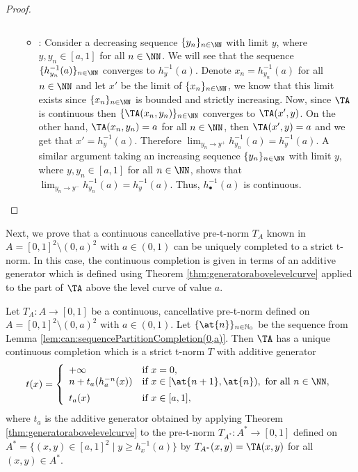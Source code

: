 \begin{proof}
\begin{enumerate}[label=(\roman*)]
\begin{itemize}
$$		$$
		\item \underline{}: Consider a decreasing sequence $\{y_n\}_{n \in \NN}$ with limit $y$, where $y,y_n \in [a,1]$ for all $n\in \NN$. We will see that the sequence $\{h_{y_n}^{-1}(a)\}_{n \in \NN}$ converges to $h_{y}^{-1}(a)$. Denote $x_n = h_{y_n}^{-1}(a)$ for all $n \in \NN$ and let $x'$ be the limit of $\{x_n\}_{n \in \NN}$, we know that this limit exists since $\{x_n\}_{n \in \NN}$ is bounded and strictly increasing. Now, since $\TA$ is continuous then $\{\TA(x_n,y_n)\}_{n \in \NN}$ converges to $\TA(x',y)$. On the other hand, $\TA(x_n,y_n)=a$ for all $n \in \NN$, then $\TA(x',y)=a$ and we get that $x' = h_{y}^{-1}(a)$. Therefore $\lim_{y_n \to y^+} h_{y_n}^{-1}(a)=h_y^{-1}(a)$. A similar argument taking an increasing sequence $\{y_n\}_{n \in \NN}$ with limit $y$, where $y,y_n \in [a,1]$ for all $n\in \NN$, shows that $\lim_{y_n \to y^-} h_{y_n}^{-1}(a)=h_y^{-1}(a)$. Thus, $h_{\bullet}^{-1}(a)$ is continuous.
	\end{itemize}
	\end{enumerate}
\end{proof}

Next, we prove that a continuous cancellative pre-t-norm $T_A$ known in $A=[0,1]^2 \setminus (0,a)^2$ with $a \in (0,1)$ can be uniquely completed to a strict t-norm. In this case, the continuous completion is given in terms of an additive generator which is defined using Theorem \ref{thm:generatorabovelevelcurve} applied to the part of $\TA$ above the level curve of value $a$.

\begin{theorem}\label{thm:can:completion(0,a)} Let $T_A: A \to [0,1]$ be a continuous, cancellative pre-t-norm defined on $A=[0,1]^2 \setminus (0,a)^2$ with $a \in (0,1)$. Let $\{\at{n}\}_{n \in \mathbb{N}_0}$ be the sequence from Lemma \ref{lem:can:sequencePartitionCompletion(0,a)}. Then $\TA$ has a unique continuous completion which is a strict t-norm $T$ with additive generator
	\begin{equation}\label{eq:can:GeneratorCompletion(0,a)}
		t(x)
		=
		\left\{ \begin{array}{ll}
			+\infty & \text{if } x=0,\\
			n+t_a(h_a^{-n}(x)) &   \text{if }   x \in [\at{n+1},\at{n}), \text{ for all } n \in \NN,\\[5pt]
			t_a(x) & \text{if } x \in [a,1],
		\end{array} \right.
	\end{equation}
	where $t_a$ is the additive generator obtained by applying Theorem \ref{thm:generatorabovelevelcurve} to the pre-t-norm $T_{A^*}: A^* \to [0,1]$ defined on $A^*=\{(x,y) \in [a,1]^2 \mid y \geq h_x^{-1}(a)\}$ by $T_{A^*}(x,y)=\TA(x,y)$ for all $(x,y) \in A^*$.
\end{theorem}

